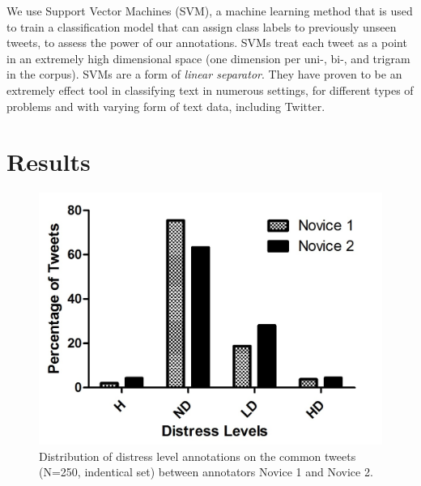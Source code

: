 \documentclass[11pt]{article}
\begin{document}
We use Support Vector Machines (SVM), a machine learning method that is used to train a classification model that can assign class labels to previously unseen tweets, to assess the power of our annotations. SVMs treat each tweet as a point in an extremely high dimensional space (one dimension per uni-, bi-, and trigram in the corpus). SVMs are a form of \emph{linear separator}. They have proven to be an extremely effect tool in classifying text in numerous settings, for different types of problems and with varying form of text data, including Twitter. 


\section{Results}




\begin{figure}
\centering
\includegraphics[scale=0.7]{ChrisCissi4cat.jpg}
\caption{Distribution of distress level annotations on the common tweets (N=250, indentical set) between annotators Novice 1 and Novice 2.}
\label{fig:distress-distrib1}
\end{figure}
\end{document}
